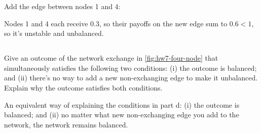 \documentclass[newpages]{assignment}
\begin{document}
\begin{solution}
    Add the edge between nodes 1 and 4:
    \begin{figure}[H]
        \centering
    \end{figure}
    Nodes 1 and 4 each receive \(0.3\), so their payoffs on the new edge sum to \(0.6<1\), so it's unstable and unbalanced.
\end{solution}

\subsection{}
\begin{problem}
    Give an outcome of the network exchange in \cref{fig:hw7-four-node} that simultaneously satisfies the following two conditions: (i) the outcome is balanced; and (ii) there's no way to add a new non-exchanging edge to make it unbalanced. Explain why the outcome satisfies both conditions.

    An equivalent way of explaining the conditions in part d: (i) the outcome is balanced; and (ii) no matter what new non-exchanging edge you add to the network, the network remains balanced.
\end{problem}
\end{document}
